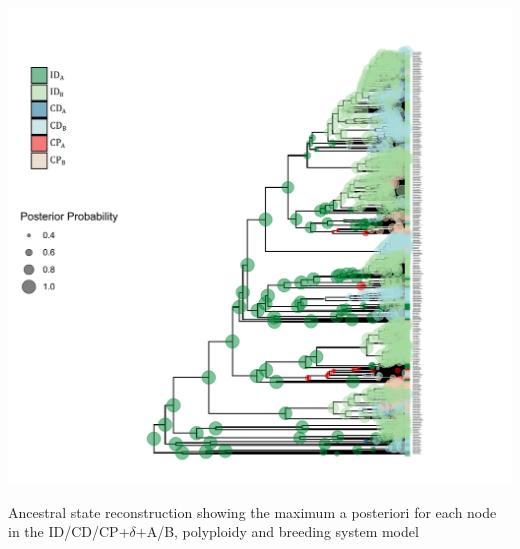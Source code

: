 \begin{suppfigure}
\includegraphics[width=\textwidth]{asrIDCDCPdeltaAB.pdf}
\caption{Ancestral state reconstruction showing the maximum a posteriori for each node in the ID/CD/CP+$\delta$+A/B, polyploidy and breeding system model} %
\label{suppfigure:IDCDCPABasr}
\end{suppfigure}


